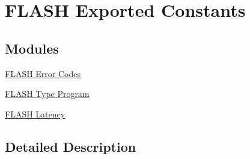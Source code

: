 \hypertarget{group___f_l_a_s_h___exported___constants}{}\section{F\+L\+A\+SH Exported Constants}
\label{group___f_l_a_s_h___exported___constants}
\subsection*{Modules}
\begin{DoxyCompactItemize}
\item 
\hyperlink{group___f_l_a_s_h___error___codes}{F\+L\+A\+S\+H Error Codes}
\item 
\hyperlink{group___f_l_a_s_h___type___program}{F\+L\+A\+S\+H Type Program}
\item 
\hyperlink{group___f_l_a_s_h___latency}{F\+L\+A\+S\+H Latency}
\end{DoxyCompactItemize}


\subsection{Detailed Description}
